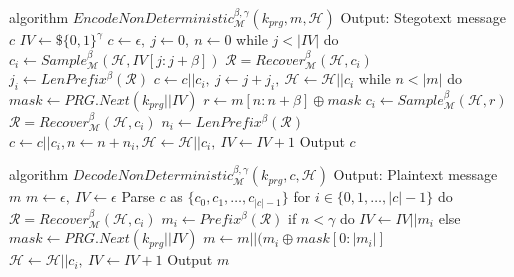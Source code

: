 \begin{Pseudocode}[float, caption={Meteor EncodeNonDeterministic Algorithm}, label={alg:encode}]
algorithm $EncodeNonDeterministic_{\mathcal{M}}^{\beta,\gamma}(k_{prg}, m, \mathcal{H})$
	Output: Stegotext message $c$
	$IV \leftarrow\$ \{0,1\}^\gamma$
	$c \leftarrow \epsilon,~ j \leftarrow 0,~ n \leftarrow 0$
	while $j < |IV|$ do
		$c_i \leftarrow Sample_{\mathcal{M}}^\beta(\mathcal{H}, IV[j: j+\beta])$
		$\mathcal{R} = Recover_{\mathcal{M}}^\beta(\mathcal{H}, c_i)$
		$j_i \leftarrow LenPrefix^\beta(\mathcal{R})$
		$c \leftarrow c || c_i,~ j \leftarrow j + j_i,~ \mathcal{H} \leftarrow \mathcal{H}||c_i$
	while $n < |m|$ do
		$mask \leftarrow PRG.Next(k_{prg}||IV)$
		$r \leftarrow m[n:n+\beta] \oplus mask$
		$c_i \leftarrow Sample_{\mathcal{M}}^\beta(\mathcal{H}, r)$
		$\mathcal{R} = Recover_{\mathcal{M}}^\beta(\mathcal{H}, c_i)$
		$n_i \leftarrow LenPrefix^\beta(\mathcal{R})$
		$c \leftarrow c || c_i, n \leftarrow n+n_i, \mathcal{H} \leftarrow \mathcal{H}||c_i,~ IV \leftarrow IV+1$
	Output $c$
\end{Pseudocode}

\begin{Pseudocode}[float, caption={Meteor DecodeNonDeterministic Algorithm}, label={alg:decode}]
algorithm $DecodeNonDeterministic_{\mathcal{M}}^{\beta,\gamma}(k_{prg}, c, \mathcal{H})$
	Output: Plaintext message $m$
	$m \leftarrow \epsilon,~ IV \leftarrow \epsilon$
	Parse $c$ as $\{ c_0, c_1, \dots, c_{|c|-1} \}$
	for $i \in \{0, 1, \dots, |c|-1 \}$ do
		$\mathcal{R} = Recover_{\mathcal{M}}^\beta(\mathcal{H}, c_i)$
		$m_i \leftarrow Prefix^\beta(\mathcal{R})$
		if $n < \gamma$ do
			$IV \leftarrow IV || m_i$
		else
			$mask \leftarrow PRG.Next(k_{prg} || IV)$
			$m \leftarrow m || (m_i \oplus mask[0: |m_i|]$
			$\mathcal{H} \leftarrow \mathcal{H}||c_i,~ IV \leftarrow IV + 1$
	Output $m$
\end{Pseudocode}

